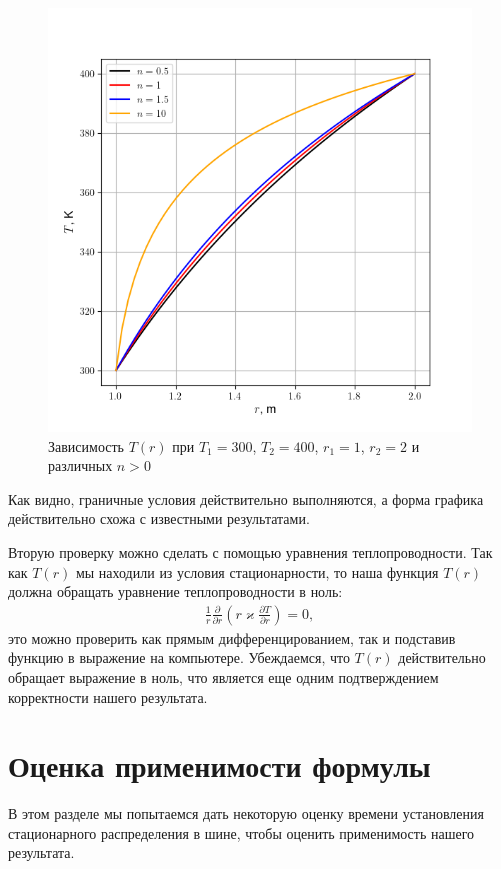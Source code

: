 \documentclass[a4paper,12pt]{report}
\begin{document}
        \begin{figure}[H]
            \centering
            \includegraphics[width=0.7\linewidth]{img/example.png}
            \caption{Зависимость $T(r)$ при $T_1=300$, $T_2=400$, $r_1=1$, $r_2=2$ и различных $n>0$}
        \end{figure}

        Как видно, граничные условия действительно выполняются, а форма графика действительно схожа с известными результатами.

        Вторую проверку можно сделать с помощью уравнения теплопроводности. Так как $T(r)$ мы находили из условия стационарности, то наша функция $T(r)$ должна обращать уравнение теплопроводности в ноль:
        \begin{gather}
            \frac{1}{r}\frac{\partial}{\partial r}\left(r\varkappa \frac{\partial T}{\partial r}\right)=0,
        \end{gather}
        это можно проверить как прямым дифференцированием, так и подставив функцию в выражение на компьютере. Убеждаемся, что $T(r)$ действительно обращает выражение в ноль, что является еще одним подтверждением корректности нашего результата.
        
    \section{Оценка применимости формулы}
        В этом разделе мы попытаемся дать некоторую оценку времени установления стационарного распределения в шине, чтобы оценить применимость нашего результата.
\end{document}
